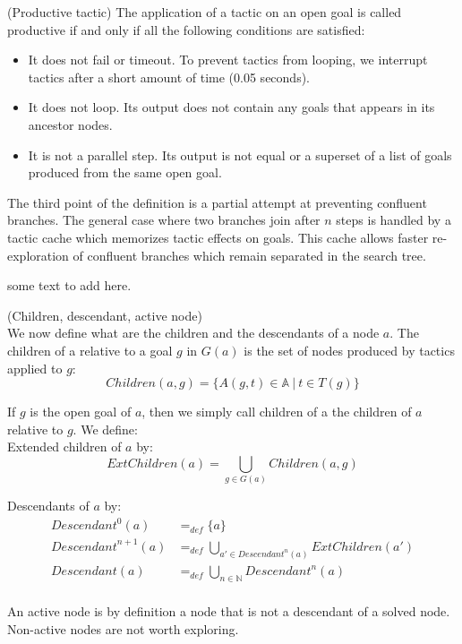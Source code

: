 \documentclass[runningheads,a4paper,draft]{svjour3}
\begin{document}
\begin{definition} (Productive tactic)
The application of a tactic on an open goal is called productive if and only if
all the following conditions are satisfied:
\begin{itemize}
\item It does not fail or timeout. To prevent tactics from looping, we
interrupt tactics after a short amount of time (0.05 seconds).
\item It does not loop. Its output does not contain any goals that appears in
its ancestor nodes.
\item It is not a parallel step. Its output is not equal or a superset
of a list of goals produced from the same open goal.
\end{itemize}

The third point of the definition is a partial attempt at preventing confluent
branches. The general case where two branches join after $n$ steps is handled
by a tactic cache which memorizes tactic effects on goals. This
cache allows faster re-exploration of confluent branches which remain
separated in the search tree.
\end{definition}

some text to add here.

\begin{definition}\label{def:desc}(Children, descendant, active node)\\
We now define what are the children and the descendants of a node $a$. The
children of a relative to a goal $g$ in $G(a)$
is the set of nodes produced by tactics applied to $g$:
  \[\mathit{Children}(a,g) = \lbrace A(g,t)\in \mathbb{A}\ |\ t \in T(g) \rbrace \]

If $g$ is the open goal of $a$, then we simply call children of a the
children of $a$ relative to $g$. We define:\\

Extended children of $a$ by:
  \[\mathit{ExtChildren}(a) = \bigcup_{g \in G(a)} \mathit{Children}(a,g) \]

Descendants of $a$ by:
\begin{align*}
\mathit{Descendant}^{0}(a) &=_{def} \lbrace a \rbrace \\
\mathit{Descendant}^{n+1}(a) &=_{def} \bigcup_{a' \in \mathit{Descendant}^{n}(a)}
\mathit{ExtChildren}(a') \\
\mathit{Descendant}(a) &=_{def} \bigcup_{n \in \mathbb{N}} \mathit{Descendant}^n(a)\\
\end{align*}


An active node is by definition a node that is not a descendant of a
solved node. Non-active nodes are not worth exploring.
\end{definition}
\end{document}
